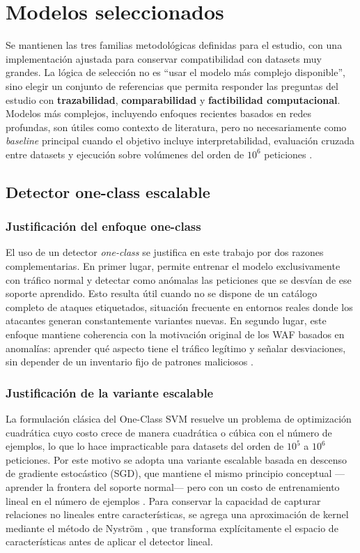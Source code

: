\documentclass[12pt,oneside]{report}
\begin{document}
\section{Modelos seleccionados}
Se mantienen las tres familias metodológicas definidas para el estudio, con una implementación ajustada para conservar compatibilidad con datasets muy grandes. La lógica de selección no es ``usar el modelo más complejo disponible'', sino elegir un conjunto de referencias que permita responder las preguntas del estudio con \textbf{trazabilidad}, \textbf{comparabilidad} y \textbf{factibilidad computacional}. Modelos más complejos, incluyendo enfoques recientes basados en redes profundas, son útiles como contexto de literatura, pero no necesariamente como \textit{baseline} principal cuando el objetivo incluye interpretabilidad, evaluación cruzada entre datasets y ejecución sobre volúmenes del orden de $10^6$ peticiones \cite{fang_2024,zhou_2024}.

\subsection{Detector one-class escalable}

\subsubsection{Justificación del enfoque one-class}
El uso de un detector \textit{one-class} se justifica en este trabajo por dos razones complementarias. En primer lugar, permite entrenar el modelo exclusivamente con tráfico normal y detectar como anómalas las peticiones que se desvían de ese soporte aprendido. Esto resulta útil cuando no se dispone de un catálogo completo de ataques etiquetados, situación frecuente en entornos reales donde los atacantes generan constantemente variantes nuevas. En segundo lugar, este enfoque mantiene coherencia con la motivación original de los WAF basados en anomalías: aprender qué aspecto tiene el tráfico legítimo y señalar desviaciones, sin depender de un inventario fijo de patrones maliciosos \cite{kruegel_vigna_2003}.

\subsubsection{Justificación de la variante escalable}
La formulación clásica del One-Class SVM \cite{scholkopf2001} resuelve un problema de optimización cuadrática cuyo costo crece de manera cuadrática o cúbica con el número de ejemplos, lo que lo hace impracticable para datasets del orden de $10^5$ a $10^6$ peticiones. Por este motivo se adopta una variante escalable basada en descenso de gradiente estocástico (SGD), que mantiene el mismo principio conceptual —aprender la frontera del soporte normal— pero con un costo de entrenamiento lineal en el número de ejemplos \cite{sklearn_sgd_ocsvm}. Para conservar la capacidad de capturar relaciones no lineales entre características, se agrega una aproximación de kernel mediante el método de Nyström \cite{williams2001,sklearn_kernel_approx}, que transforma explícitamente el espacio de características antes de aplicar el detector lineal.
\end{document}
